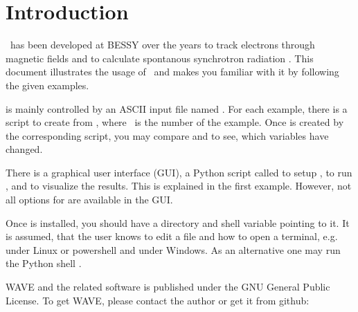 
\renewcommand*\thesection{\Roman{section}}
\section{Introduction}

\W~has been developed at BESSY over the years to track electrons
through magnetic fields and to calculate spontanous synchrotron radiation
\cite{dok}.
This document illustrates the usage of \W~and makes you
familiar with it by following the given examples.

\W is mainly controlled by an ASCII input file named \wie.
For each example, there is a script  to
create \wi from \wee, where ~is the number of the example. Once
\wi is created by the corresponding script, you may compare
\we and \wi to see, which variables have changed.

There is a graphical user interface (GUI), a Python script called
\WSH to setup \wie, to run \W, and to visualize the
results. This is explained in the first example. However, not all
options for \W are available in the GUI.

Once \W is installed, you should have a \W directory and shell
variable \W pointing to it. It is assumed, that the user knows to edit
a file and how to open a terminal, e.g.  under Linux  or powershell and under
Windows. As an alternative one may run the Python shell .

WAVE and the related software is published under the GNU General Public
License. To get WAVE, please contact the author or get it from github:

~~~~~

